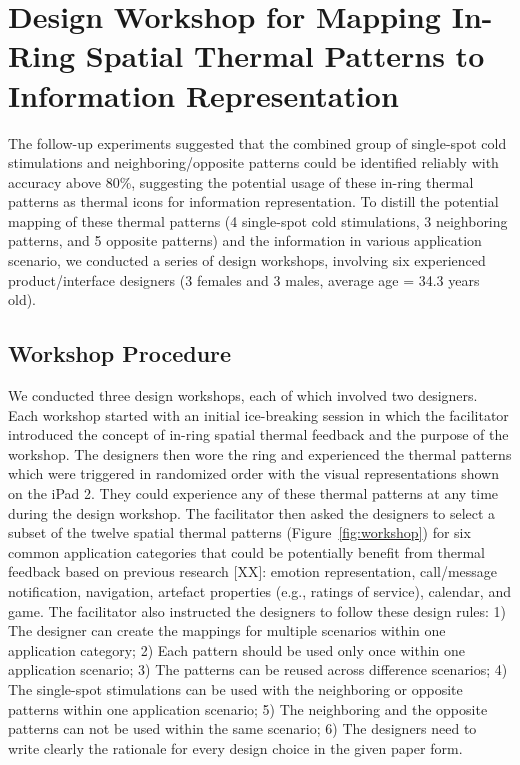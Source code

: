 \documentclass[preprint,12pt]{elsarticle}
\begin{document}
\section{Design Workshop for Mapping In-Ring Spatial Thermal Patterns to Information Representation}
The follow-up experiments suggested that the combined group of single-spot cold stimulations and neighboring/opposite patterns could be identified reliably with accuracy above 80\%, suggesting the potential usage of these in-ring thermal patterns as thermal icons for information representation.
To distill the potential mapping of these thermal patterns (4 single-spot cold stimulations, 3 neighboring patterns, and 5 opposite patterns) and the information in various application scenario, we conducted a series of design workshops, involving six experienced product/interface designers (3 females and 3 males, average age = 34.3 years old).

\subsection{Workshop Procedure}
We conducted three design workshops, each of which involved two designers. Each workshop started with an initial ice-breaking session in which the facilitator introduced the concept of in-ring spatial thermal feedback and the purpose of the workshop. The designers then wore the ring and experienced the thermal patterns which were triggered in randomized order with the visual representations shown on the iPad 2. They could experience any of these thermal patterns at any time during the design workshop. The facilitator then asked the designers to select a subset of the twelve spatial thermal patterns (Figure~\ref{fig:workshop}) for six common application categories that could be potentially benefit from thermal feedback based on previous research [XX]: emotion representation, call/message notification, navigation, artefact properties (e.g., ratings of service), calendar, and game. The facilitator also instructed the designers to follow these design rules: 1) The designer can create the mappings for multiple scenarios within one application category; 2) Each pattern should be used only once within one application scenario; 3) The patterns can be reused across difference scenarios; 4) The single-spot stimulations can be used with the neighboring or opposite patterns within one application scenario; 5) The neighboring and the opposite patterns can not be used within the same scenario; 6) The designers need to write clearly the rationale for every design choice in the given paper form.
\end{document}
